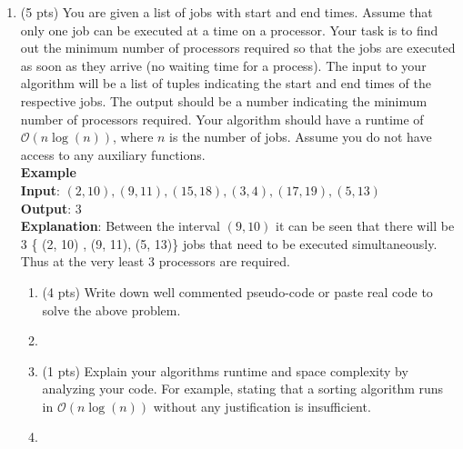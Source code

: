 \documentclass[12pt]{article}
\newcommand{\makenonemptybox}[2]{%
\item[]
\fbox{%
\parbox[c][#1][t]{\dimexpr\linewidth-2\fboxsep-2\fboxrule}{
  \hrule width \hsize height 0pt
  #2
 }%
}%
\par\vspace{\ht\strutbox}
}
\begin{document}





\begin{enumerate}


	
	
	
	\item{
	    (5 pts) You are given a list of jobs with start and end times. Assume that only one job can be executed at a time on a processor. Your task is to find out the minimum number of processors required so that the jobs are  executed as soon as they arrive (no waiting time for a process).
	    The input to your algorithm will be a list of tuples indicating the start and end times of the respective jobs. The output should be a number indicating the minimum number of processors required. Your algorithm should have a runtime of $\mathcal{O}(n \log(n))$, where $n$ is the number of jobs. Assume you do not have access to any auxiliary functions.\\
	    
	    \textbf{Example} \\
        \textbf{Input}: $(2, 10) , (9, 11), (15, 18), (3, 4), (17, 19), (5, 13)$ \\
        \textbf{Output}: $3$ \\
        \textbf{Explanation}: Between the interval $(9, 10)$ it can be seen that there will be 3 \{ (2, 10) , (9, 11),  (5, 13)\} jobs that need to be executed simultaneously. Thus at the very least 3 processors are required. \\ 
        
        \begin{enumerate}
	        \item (4 pts) Write down well commented pseudo-code or paste real code to solve the above problem.
	        \makenonemptybox{3in}{}
	        \clearpage
	        \item (1 pts) Explain your algorithms runtime and space complexity by analyzing your code. For example, stating that a sorting algorithm runs in $\mathcal{O}(n \log(n))$ without any justification is insufficient. 
	        \makenonemptybox{3in}{}
	    \end{enumerate}
	}
	
	\clearpage
	

\end{enumerate}
\end{document}
